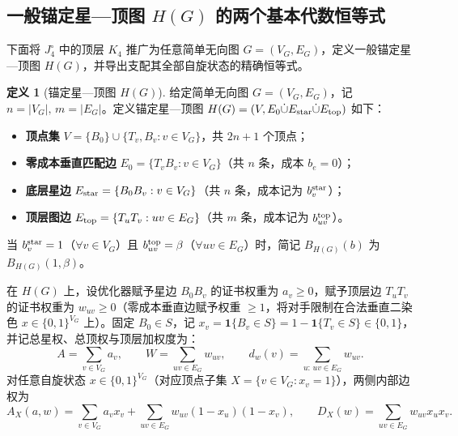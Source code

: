 \documentclass[11pt,a4paper]{ctexart}
\theoremstyle{definition}
\newtheorem{definition}[theorem]{定义}
\newcommand{\1}{\boldsymbol 1}
\newcommand{\0}{\boldsymbol 0}
\begin{document}
\subsection{一般锚定星—顶图 $H(G)$ 的两个基本代数恒等式}
下面将 $J_4^\circ$ 中的顶层 $K_4$ 推广为任意简单无向图 $G=(V_G,E_G)$，定义一般锚定星—顶图 $H(G)$，并导出支配其全部自旋状态的精确恒等式。

\begin{definition}[锚定星—顶图 $H(G)$]\label{def:HG}
给定简单无向图 $G=(V_G,E_G)$，记 $n=|V_G|,\, m=|E_G|$。定义锚定星—顶图 $H(G)=(V,E_0\dot\cup E_{\rm star}\dot\cup E_{\rm top})$ 如下：
\begin{itemize}
\item \textbf{顶点集} $V=\{B_0\}\cup\{T_v,B_v:v\in V_G\}$，共 $2n+1$ 个顶点；
\item \textbf{零成本垂直匹配边} $E_0=\{T_vB_v:v\in V_G\}$（共 $n$ 条，成本 $b_e=0$）；
\item \textbf{底层星边} $E_{\rm star}=\{B_0B_v:v\in V_G\}$（共 $n$ 条，成本记为 $b_v^{\rm star}$）；
\item \textbf{顶层图边} $E_{\rm top}=\{T_uT_v:uv\in E_G\}$（共 $m$ 条，成本记为 $b_{uv}^{\rm top}$）。
\end{itemize}
当 $b_v^{\rm star}=1$（$\forall v\in V_G$）且 $b_{uv}^{\rm top}=\beta$（$\forall uv\in E_G$）时，简记 $B_{H(G)}(b)$ 为 $B_{H(G)}(1,\beta)$。
\end{definition}

在 $H(G)$ 上，设优化器赋予星边 $B_0B_v$ 的证书权重为 $a_v\ge 0$，赋予顶层边 $T_uT_v$ 的证书权重为 $w_{uv}\ge 0$（零成本垂直边赋予权重 $\ge 1$，将对手限制在合法垂直二染色 $x\in\{0,1\}^{V_G}$ 上）。固定 $B_0\in S$，记 $x_v=\1\{B_v\in S\}=1-\1\{T_v\in S\}\in\{0,1\}$，并记总星权、总顶权与顶层加权度为：
\begin{equation}\label{eq:AW_deg}
 A=\sum_{v\in V_G}a_v,\qquad W=\sum_{uv\in E_G}w_{uv},\qquad d_w(v)=\sum_{u:\,uv\in E_G}w_{uv}.
\end{equation}
对任意自旋状态 $x\in\{0,1\}^{V_G}$（对应顶点子集 $X=\{v\in V_G:x_v=1\}$），两侧内部边权为
\begin{equation}\label{eq:HG_AD}
 A_X(a,w)=\sum_{v\in V_G}a_v x_v + \sum_{uv\in E_G}w_{uv}(1-x_u)(1-x_v),\qquad
 D_X(w)=\sum_{uv\in E_G}w_{uv}x_u x_v.
\end{equation}
\end{document}
